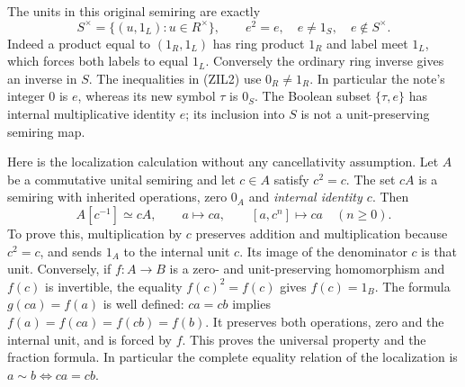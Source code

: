 The units in this original semiring are exactly
\begin{equation}\tag{ZIL2}
 S^\times=\{(u,1_L):u\in R^\times\},\qquad
 e^2=e,\quad e\ne1_S,\quad e\notin S^\times.
\end{equation}
Indeed a product equal to $(1_R,1_L)$ has ring product $1_R$ and
label meet $1_L$, which forces both labels to equal $1_L$.
Conversely the ordinary ring inverse gives an inverse in $S$.
The inequalities in (ZIL2) use $0_R\ne1_R$.
In particular the note's integer $0$ is $e$, whereas its new symbol
$\tau$ is $0_S$. The Boolean subset $\{\tau,e\}$ has internal
multiplicative identity $e$; its inclusion into $S$ is not a
unit-preserving semiring map.

Here is the localization calculation without any cancellativity
assumption. Let $A$ be a commutative unital semiring and let
$c\in A$ satisfy $c^2=c$. The set $cA$ is a semiring with inherited
operations, zero $0_A$ and \emph{internal identity $c$}. Then
\begin{equation}\tag{ZIL3}
 A[c^{-1}]\simeq cA,\qquad a\longmapsto ca,
 \qquad [a,c^n]\longmapsto ca\quad(n\ge0).
\end{equation}
To prove this, multiplication by $c$ preserves addition and
multiplication because $c^2=c$, and sends $1_A$ to the internal
unit $c$. Its image of the denominator $c$ is that unit. Conversely,
if $f:A\to B$ is a zero- and unit-preserving homomorphism and
$f(c)$ is invertible, the equality $f(c)^2=f(c)$ gives $f(c)=1_B$.
The formula $g(ca)=f(a)$ is well defined: $ca=cb$ implies
$f(a)=f(ca)=f(cb)=f(b)$. It preserves both operations, zero and
the internal unit, and is forced by $f$. This proves the universal
property and the fraction formula. In particular the complete
equality relation of the localization is
$a\sim b\Longleftrightarrow ca=cb$.

